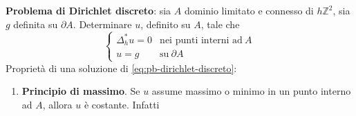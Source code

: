 \documentclass[10pt,a4paper,twoside,openright]{book}
\begin{document}
\textbf{Problema di Dirichlet discreto}: sia $\displaystyle A$ dominio limitato e connesso di $\displaystyle h\mathbb{Z}^{2}$, sia $\displaystyle g$ definita su $\displaystyle \partial A$. Determinare $\displaystyle u$, definito su $\displaystyle A$, tale che
\begin{equation}
	\begin{cases}
		\Delta ^{*}_{h} u=0 & \text{nei punti interni ad} \ A \\
		u=g                 & \text{su} \ \partial A          
	\end{cases}
	\label{eq:pb-dirichlet-discreto}
\end{equation}
Proprietà di una soluzione di \eqref{eq:pb-dirichlet-discreto}:
\begin{enumerate}
	\item \textbf{Principio di massimo}. Se $\displaystyle u$ assume massimo o minimo in un punto interno ad $\displaystyle A$, allora $\displaystyle u$ è costante. Infatti
		\begin{figure}[htpb]
	      	\centering
	      	


	      	\begin{tikzpicture}[x=0.75pt,y=0.75pt,yscale=-1,xscale=1]


\end{tikzpicture}
\end{figure}
\end{enumerate}
\end{document}
